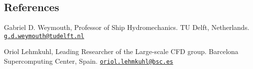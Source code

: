 \documentclass[line]{res}
\newenvironment{p1}
  {\begin{adjustwidth}{-16pt}{0pt}
  \vspace{1pt}}
  {\end{adjustwidth}}
\begin{document}
\begin{resume}
\section{References}\vspace{0.2cm}
\begin{p1}\setlength{\parskip}{1em}
Gabriel D. Weymouth, Professor of Ship Hydromechanics.\newline
TU Delft, Netherlands.\newline
\href{mailto:g.d.weymouth@tudelft.nl}{\texttt{g.d.weymouth@tudelft.nl}}

Oriol Lehmkuhl, Leading Researcher of the Large-scale CFD group.\newline
Barcelona Supercomputing Center, Spain.\newline
\href{mailto:oriol.lehmkuhl@bsc.es}{\texttt{oriol.lehmkuhl@bsc.es}}
\end{p1}
\end{resume}
\end{document}
